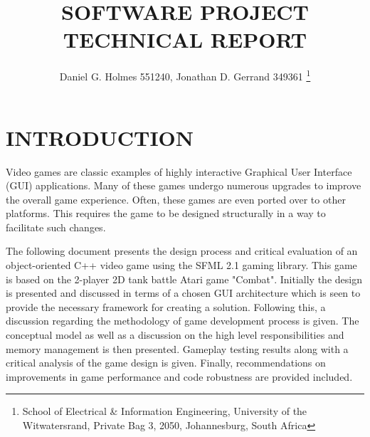 \documentclass[10pt,twocolumn]{witseiepaper}
\begin{document}
\title{SOFTWARE PROJECT TECHNICAL REPORT}

\author{Daniel G. Holmes 551240, Jonathan D. Gerrand 349361
\thanks{School of Electrical \& Information Engineering, University of the
Witwatersrand, Private Bag 3, 2050, Johannesburg, South Africa}
}

% 



\maketitle
\thispagestyle{empty}\pagestyle{empty}


%
\section{INTRODUCTION}%
Video games are classic examples of highly interactive Graphical User Interface (GUI) applications. Many of these games undergo numerous upgrades to improve the overall game experience. Often, these games are even ported over to other platforms. This requires the game to be designed structurally in a way to facilitate such changes. 

The following document presents the design process and critical evaluation of an object-oriented C++ video game using the SFML 2.1 gaming library. This game is based on the 2-player 2D tank battle Atari game "Combat". Initially the design is presented and discussed in terms of a chosen GUI architecture which is seen to provide the necessary framework for creating a solution. Following this, a discussion regarding the methodology of game development process is given. The conceptual model as well as a discussion on the high level responsibilities and memory management is then presented. Gameplay testing results along with a critical analysis of the game design is given. Finally, recommendations on improvements in game performance and code robustness are provided included.
\end{document}
